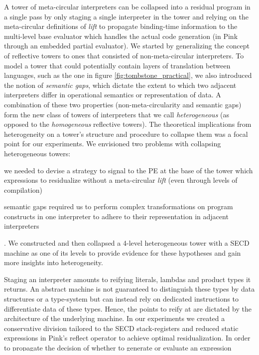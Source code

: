 \documentclass[a4paper,12pt,twoside,openright]{report}
\theoremstyle{definition}
\begin{document}
A tower of meta-circular interpreters can be collapsed into a residual program in a single pass by only staging a single interpreter in the tower and relying on the meta-circular definitions of \textit{lift} to propagate binding-time information to the multi-level base evaluator which handles the actual code generation (in Pink through an embedded partial evaluator). We started by generalizing the concept of reflective towers to ones that consisted of non-meta-circular interpreters. To model a tower that could potentially contain layers of translation between languages, such as the one in figure \ref{fig:tombstone_practical}, we also introduced the notion of \textit{semantic gaps}, which dictate the extent to which two adjacent interpreters differ in operational semantics or representation of data. A combination of these two properties (non-meta-circularity and semantic gaps) form the new class of towers of interpreters that we call \textit{heterogeneous} (as opposed to the \textit{homogeneous} reflective towers). The theoretical implications from heterogeneity on a tower's structure and procedure to collapse them was a focal point for our experiments. We envisioned two problems with collapsing heterogeneous towers:
\begin{enumerate*}[label=(\arabic*)]
    \item we needed to devise a strategy to signal to the PE at the base of the tower which expressions to residualize without a meta-circular \textit{lift} (even through levels of compilation)
    \item semantic gaps required us to perform complex transformations on program constructs in one interpreter to adhere to their representation in adjacent interpreters
\end{enumerate*}. We constructed and then collapsed a 4-level heterogeneous tower with a SECD machine as one of its levels to provide evidence for these hypotheses and gain more insights into heterogeneity.

Staging an interpreter amounts to reifying literals, lambdas and product types it returns. An abstract machine is not guaranteed to distinguish these types by data structures or a type-system but can instead rely on dedicated instructions to differentiate data of these types. Hence, the points to reify at are dictated by the architecture of the underlying machine. In our experiments we created a conservative division tailored to the SECD stack-registers and reduced static expressions in Pink's reflect operator to achieve optimal residualization. In order to propagate the decision of whether to generate or evaluate an expression through levels in the tower, we implemented a \textbf{lift} operator (or abstract machine instruction in the case of our SECD compiler) at the level which previously did not support such an operation.
\end{document}
